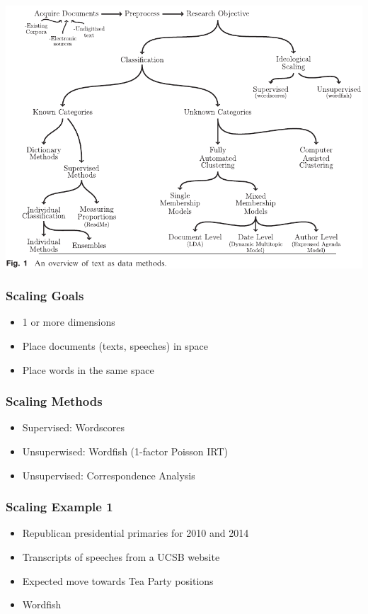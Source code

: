 \documentclass[20pt]{beamer}
\begin{document}
\begin{frame}
    \hspace*{-12mm}
    \href{http://pan.oxfordjournals.org/content/21/3/267}{\includegraphics[width=\paperwidth]{gs_fig1_scissored.pdf}}
\end{frame}


\begin{frame}
	\frametitle{Scaling Goals}
	\begin{itemize}
		\item 	1 or more dimensions
		\item 	Place documents (texts, speeches) in space
		\item 	Place words in the same space
	\end{itemize}
\end{frame}


\begin{frame}
	\frametitle{Scaling Methods}
	\begin{itemize}
		\item 	Supervised: Wordscores
		\item 	Unsuperwised: Wordfish (1-factor Poisson IRT)
		\item 	Unsupervised: Correspondence Analysis
	\end{itemize}
\end{frame}


\begin{frame}
	\frametitle{Scaling Example 1}
	\begin{itemize}
		\item 	Republican presidential primaries for 2010 and 2014
		\item 	Transcripts of speeches from a UCSB website
		\item 	Expected move towards Tea Party positions
		\item   Wordfish
	\end{itemize}
\end{frame}
\end{document}
